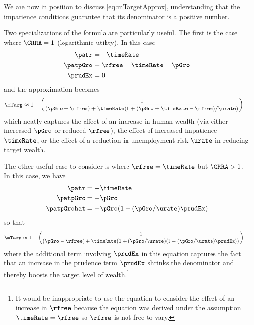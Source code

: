 \documentclass{handout}
\begin{document}
We are now in position to discuss \eqref{eq:mTargetApprox}, understanding that the
impatience conditions guarantee that its denominator is a positive number.

Two specializations of the formula are particularly useful.  The first is
the case where $\CRRA = 1$ (logarithmic utility).  In this case
\begin{equation}\begin{gathered}\begin{aligned}
    \patr & =  -\timeRate
\\  \patpGro & =  \rfree-\timeRate-\pGro
\\  \prudEx & =  0
\end{aligned}\end{gathered}\end{equation}
and the approximation becomes
\begin{equation}\begin{gathered}\begin{aligned}
 \mTarg^{\null} & \approx  1 + \left(\frac{1}{(\pGro-\rfree)+\timeRate(1+(\pGro+\timeRate-\rfree)/\urate)}\right)
\end{aligned}\end{gathered}\end{equation}
which neatly captures the effect of an increase in human wealth (via either increased $\pGro$ or reduced $\rfree$), the effect of increased impatience $\timeRate$,
or the effect of a reduction in unemployment risk $\urate$ in reducing target wealth.


The other useful case to consider is where $\rfree = \timeRate$ but $\CRRA>1$.  In this case, we have
\begin{equation}\begin{gathered}\begin{aligned}
    \patr & =  -\timeRate
\\  \patpGro & =  -\pGro
\\  \patpGrohat & =  -\pGro (1-(\pGro/\urate)\prudEx)
\end{aligned}\end{gathered}\end{equation}
so that
\begin{equation}\begin{gathered}\begin{aligned}
 \mTarg^{\null} & \approx  1 + \left(\frac{1}{(\pGro-\rfree)+\timeRate(1+(\pGro/\urate)(1-(\pGro/\urate)\prudEx))}\right)
\end{aligned}\end{gathered}\end{equation}
where the additional term involving $\prudEx$ in this equation
captures the fact that an increase in the prudence term $\prudEx$
shrinks the denominator and thereby boosts the target level of
wealth.\footnote{It would be inappropriate to use the equation to
  consider the effect of an increase in $\rfree$ because the equation was derived under the
  assumption $\timeRate=\rfree$ so $\rfree$ is not free to vary.}
\end{document}
